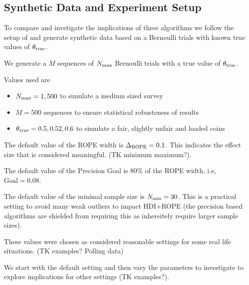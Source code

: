 \subsection{Synthetic Data and Experiment Setup}

To compare and invetigate the implications of three algorithms we
follow the setup of \cite{kruschke2015doing} and generate synthetic data
based on a Bernoulli trials with known true values of $\theta_{\rm true}$.

We generate a $M$ sequences of $N_{\rm max}$ Bernoulli trials with a true value of $\theta_{\rm true}$.

Values used are

\begin{itemize}
    \item $N_{\rm max}=1,500$ to simulate a medium sized survey
    \item $M=500$ sequences to ensure statistical robusteness of results
    \item $\theta_{\rm true}=0.5, 0.52, 0.6$ to simulate a fair, slightly unfair and loaded coins
\end{itemize}

The default value of the ROPE width is $\Delta_{\rm ROPE}=0.1$. This indicates
the effect size that is considered meaningful. (TK minimum maximum?).

The default value of the Precision Goal is 80\% of the ROPE width, i.e, $\mathrm{Goal}=0.08$.

The default value of the minimal sample size is $N_{\rm min}=30$. This is a practical
setting to avoid many weak outliers to impact HDI+ROPE (the precision based algorithms
are shielded from requiring this as inhereitely require larger sample sizes).

These values were chosen as considered reasonable settings for some real life
situations. (TK examples? Polling data)

We start with the default setting and then vary the parameters to investigate to
explore implications for other settings (TK examples?).


